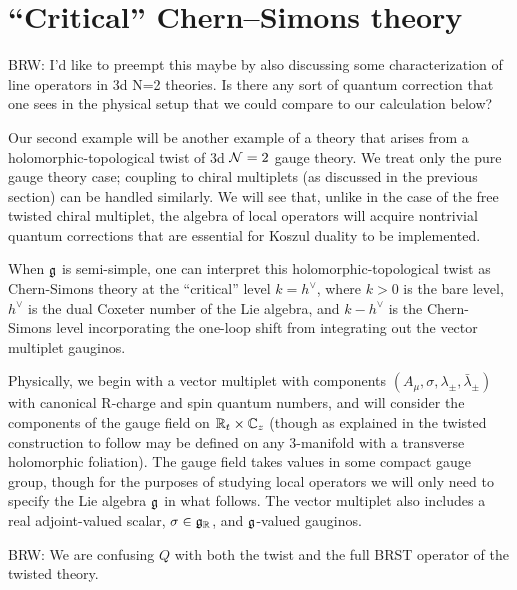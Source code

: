 \documentclass[11pt]{amsart}
\def\brian#1{{\textcolor{blue!65!red}{BRW: {#1}}}}
\begin{document}
\section{``Critical'' Chern--Simons theory}\label{s:crit}

\brian{I'd like to preempt this maybe by also discussing some characterization of line operators in 3d N=2 theories. 
Is there any sort of quantum correction that one sees in the physical setup that we could compare to our calculation below?}

Our second example will be another example of a theory that arises from a holomorphic-topological twist of 3d $\mathcal N=2$ gauge theory. 
We treat only the pure gauge theory case; coupling to chiral multiplets (as discussed in the previous section) can be handled similarly. 
We will see that, unlike in the case of the free twisted chiral multiplet, the algebra of local operators will acquire nontrivial quantum corrections that are essential for Koszul duality to be implemented. 

When $\mathfrak g$ is semi-simple, one can interpret this holomorphic-topological twist as Chern-Simons theory at the ``critical'' level $k = h^{\vee}$, where $k > 0$ is the bare level, $h^{\vee}$ is the dual Coxeter number of the Lie algebra, and $k - h^{\vee}$ is the Chern-Simons level incorporating the one-loop shift from integrating out the vector multiplet gauginos. 

Physically, we begin with a vector multiplet with components $(A_{\mu}, \sigma, \lambda_{\pm}, \bar{\lambda}_{\pm})$ with canonical R-charge and spin quantum numbers, and will consider the components of the gauge field on $\mathbb R_t \times \mathbb C_{z}$ (though as explained in \cite{ACNV} the twisted construction to follow may be defined on any 3-manifold with a transverse holomorphic foliation). The gauge field takes values in some compact gauge group, though for the purposes of studying local operators we will only need to specify the Lie algebra $\mathfrak g$ in what follows. The vector multiplet also includes a real adjoint-valued scalar, $\sigma \in \mathfrak g_{\mathbb R}$, and $\mathfrak g$-valued gauginos. 

\brian{We are confusing $Q$ with both the twist and the full BRST operator of the twisted theory.}
\end{document}
